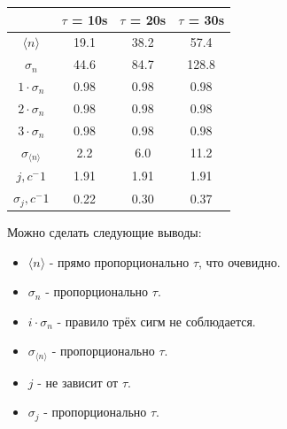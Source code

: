 \documentclass[12pt, a4paper]{article}
\begin{document}
\begin{center}
    \begin{tabular}{|c|c|c|c|}

        \hline
        
        & $\tau$ = 10s & $\tau$ = 20s & $\tau$ = 30s \\

        \hline

        $\langle n \rangle$ & 19.1 & 38.2 & 57.4 \\

        \hline

        $\sigma_n$ & 44.6 & 84.7 & 128.8 \\

        \hline

        $1 \cdot \sigma_n$ & 0.98 & 0.98 & 0.98 \\

        \hline

        $2 \cdot \sigma_n$ & 0.98 & 0.98 & 0.98 \\

        \hline

        $3 \cdot \sigma_n$ & 0.98 & 0.98 & 0.98 \\

        \hline

        $\sigma_{\langle n \rangle}$ &
        2.2 & 6.0 & 11.2 \\

        \hline

        $j, c^-1$ & 1.91 & 1.91 & 1.91 \\

        \hline

        $\sigma_j, c^-1$ & 0.22 & 0.30 & 0.37 \\

        \hline

    \end{tabular}
\end{center}

Можно сделать следующие выводы:

\begin{itemize}
    \item $\langle n \rangle$ - прямо пропорционально $\tau$, что очевидно.
    \item $\sigma_n$ - пропорционально $\tau$.
    \item $i \cdot \sigma_n$ - правило трёх сигм не соблюдается.
    \item $\sigma_{\langle n \rangle}$ - пропорционально $\tau$.
    \item $j$ - не зависит от $\tau$.
    \item $\sigma_j$ - пропорционально $\tau$.
\end{itemize}
\end{document}

